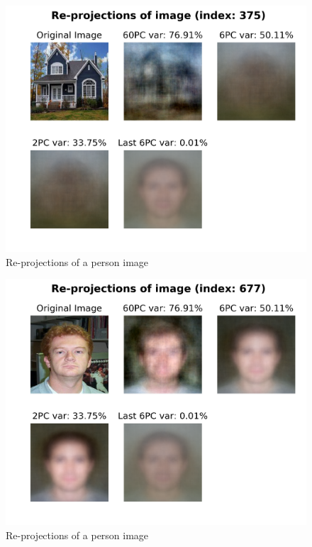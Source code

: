 \documentclass[a4paper, 11pt]{article}
\begin{document}
	\begin{figure}[ht!]
		\centering
		\includegraphics[height=0.5\paperwidth]{img/fig01c.png}
		\caption{Re-projections of a person image}
		\label{fig:house1}
	\end{figure}
	\begin{figure}[ht!]
		\centering
		\includegraphics[height=0.5\paperwidth]{img/fig01d.png}
		\caption{Re-projections of a person image}
		\label{fig:person1}
	\end{figure}
	
	\FloatBarrier
	
\end{document}
